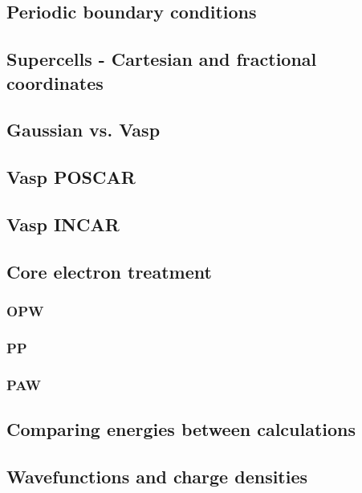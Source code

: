 \documentclass[11pt]{article}
\begin{document}
\subsection{Periodic boundary conditions}
\label{sec-8-2}

\subsection{Supercells - Cartesian and fractional coordinates}
\label{sec-8-3}

\subsection{Gaussian vs. Vasp}
\label{sec-8-4}

\subsection{Vasp POSCAR}
\label{sec-8-5}

\subsection{Vasp INCAR}
\label{sec-8-6}

\subsection{Core electron treatment}
\label{sec-8-7}

\subsubsection{OPW}
\label{sec-8-7-1}

\subsubsection{PP}
\label{sec-8-7-2}

\subsubsection{PAW}
\label{sec-8-7-3}

\subsection{Comparing energies between calculations}
\label{sec-8-8}

\subsection{Wavefunctions and charge densities}
\label{sec-8-9}
\end{document}

